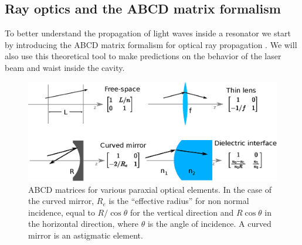 \subsection{Ray optics and the ABCD matrix formalism}

To better understand the propagation of light waves inside a resonator we start by introducing the ABCD matrix formalism for optical ray propagation \parencite{Brouwer1964,siegman86}. We will also use this theoretical tool to make predictions on the behavior of the laser beam and waist inside the cavity.
\begin{figure}
	\centering
	\includegraphics[width=1\linewidth]{images/abcd.eps}
	\caption{ABCD matrices for various paraxial optical elements. In the case of the curved mirror, $R_e$ is the ``effective radius'' for non normal incidence, equal to $R/\cos\theta$ for the vertical direction and $R\cos\theta$ in the horizontal direction, where $\theta$ is the angle of incidence. A curved mirror is an astigmatic element.}
	\label{fig:abcd}
\end{figure}

